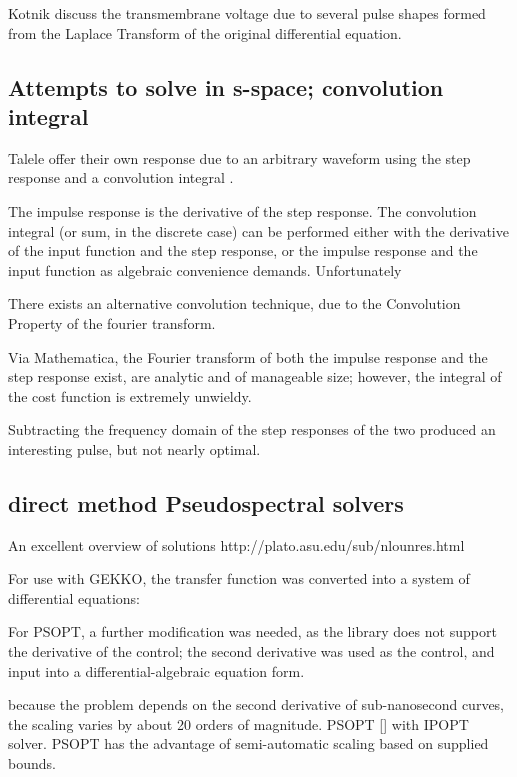 \documentclass[fleqn,10pt]{paper}
\begin{document}
Kotnik discuss the transmembrane voltage due to several pulse shapes formed from the Laplace Transform of the original differential equation. 

\subsection{Attempts to solve in s-space; convolution integral}

Talele offer their own response due to an arbitrary waveform using the step response and a convolution integral \cite{Nonlinear2007}.

The impulse response is the derivative of the step response. The convolution integral (or sum, in the discrete case) can be performed either with the derivative of the input function and the step response, or the impulse response and the input function as algebraic convenience demands. Unfortunately

There exists an alternative convolution technique, due to the Convolution Property of the fourier transform.

Via Mathematica, the Fourier transform of both the impulse response and the step response exist, are analytic and of manageable size; however, the integral of the cost function is extremely unwieldy.

Subtracting the frequency domain of the step responses of the two produced an interesting pulse, but not nearly optimal.

\subsection*{direct method Pseudospectral solvers}

An excellent overview of solutions http://plato.asu.edu/sub/nlounres.html

For use with GEKKO, the transfer function was converted into a system of differential equations:

For PSOPT, a further modification was needed, as the library does not support the derivative of the control; the second derivative was used as the control, and input into a differential-algebraic equation form.



because the problem depends on the second derivative of sub-nanosecond curves, the scaling varies by about 20 orders of magnitude.
PSOPT [] with IPOPT\cite{implementation2006} solver. PSOPT has the advantage of semi-automatic scaling based on supplied bounds. 
\end{document}
